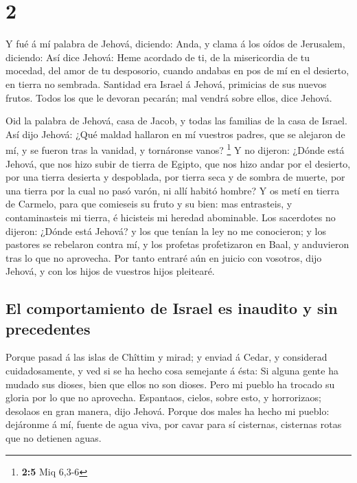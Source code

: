 \hypertarget{section-1}{%
\section{2}\label{section-1}}

 Y fué á mí palabra de Jehová, diciendo:  Anda,
y clama á los oídos de Jerusalem, diciendo: Así dice Jehová: Heme
acordado de ti, de la misericordia de tu mocedad, del amor de tu
desposorio, cuando andabas en pos de mí en el desierto, en tierra no
sembrada.  Santidad era Israel á Jehová, primicias de sus
nuevos frutos. Todos los que le devoran pecarán; mal vendrá sobre ellos,
dice Jehová.

 Oid la palabra de Jehová, casa de Jacob, y todas las
familias de la casa de Israel.  Así dijo Jehová: ¿Qué maldad
hallaron en mí vuestros padres, que se alejaron de mí, y se fueron tras
la vanidad, y tornáronse vanos? \footnote{\textbf{2:5} Miq 6,3-6}
 Y no dijeron: ¿Dónde está Jehová, que nos hizo subir de
tierra de Egipto, que nos hizo andar por el desierto, por una tierra
desierta y despoblada, por tierra seca y de sombra de muerte, por una
tierra por la cual no pasó varón, ni allí habitó hombre?  Y
os metí en tierra de Carmelo, para que comieseis su fruto y su bien: mas
entrasteis, y contaminasteis mi tierra, é hicisteis mi heredad
abominable.  Los sacerdotes no dijeron: ¿Dónde está Jehová?
y los que tenían la ley no me conocieron; y los pastores se rebelaron
contra mí, y los profetas profetizaron en Baal, y anduvieron tras lo que
no aprovecha.  Por tanto entraré aún en juicio con vosotros,
dijo Jehová, y con los hijos de vuestros hijos pleitearé.

\hypertarget{el-comportamiento-de-israel-es-inaudito-y-sin-precedentes}{%
\subsection{El comportamiento de Israel es inaudito y sin
precedentes}\label{el-comportamiento-de-israel-es-inaudito-y-sin-precedentes}}

 Porque pasad á las islas de Chîttim y mirad; y enviad á
Cedar, y considerad cuidadosamente, y ved si se ha hecho cosa semejante
á ésta:  Si alguna gente ha mudado sus dioses, bien que
ellos no son dioses. Pero mi pueblo ha trocado su gloria por lo que no
aprovecha.  Espantaos, cielos, sobre esto, y horrorizaos;
desolaos en gran manera, dijo Jehová.  Porque dos males ha
hecho mi pueblo: dejáronme á mí, fuente de agua viva, por cavar para sí
cisternas, cisternas rotas que no detienen aguas.

